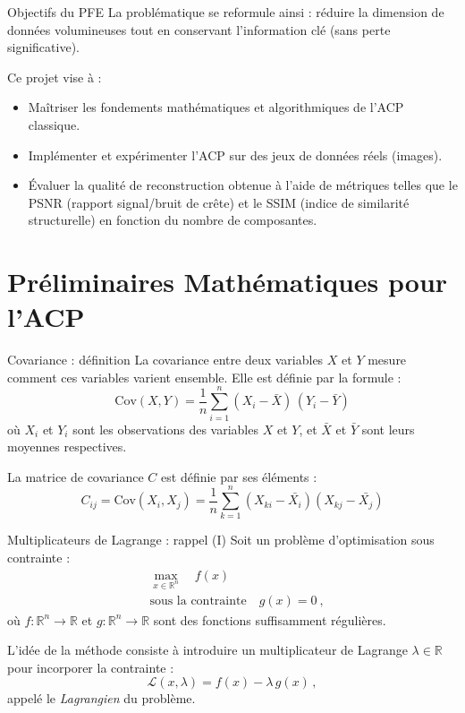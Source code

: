 \documentclass{beamer}
\begin{document}
\begin{frame}{Objectifs du PFE}
La problématique se reformule ainsi : réduire la dimension de données volumineuses tout en conservant l’information clé (sans perte significative).

Ce projet vise à :
\begin{itemize}
  \item Maîtriser les fondements mathématiques et algorithmiques de l’ACP classique.
  \item Implémenter et expérimenter l’ACP sur des jeux de données réels (images).
  \item Évaluer la qualité de reconstruction obtenue à l’aide de métriques telles que le PSNR (rapport signal/bruit de crête) et le SSIM (indice de similarité structurelle) en fonction du nombre de composantes.
\end{itemize}
\end{frame}

\section{Préliminaires Mathématiques pour l'ACP}

\begin{frame}{Covariance : définition}
La covariance entre deux variables $X$ et $Y$ mesure comment ces variables varient ensemble. Elle est définie par la formule :
\[
\text{Cov}(X, Y) = \frac{1}{n} \sum_{i=1}^n (X_i - \bar X)\,(Y_i - \bar Y)
\]
où $X_i$ et $Y_i$ sont les observations des variables $X$ et $Y$, et $\bar X$ et $\bar Y$ sont leurs moyennes respectives.

La matrice de covariance $C$ est définie par ses éléments :
\[
C_{ij} = \text{Cov}(X_i, X_j) = \frac{1}{n} \sum_{k=1}^n (X_{ki} - \bar{X_i})(X_{kj} - \bar{X_j})
\]
\end{frame}

\begin{frame}{Multiplicateurs de Lagrange : rappel (I)}
Soit un problème d'optimisation sous contrainte :
\[
\begin{aligned}
& \max_{x \in \mathbb{R}^n} \quad f(x) \\
& \text{sous la contrainte} \quad g(x) = 0~,
\end{aligned}
\]
où $f : \mathbb{R}^n \to \mathbb{R}$ et $g : \mathbb{R}^n \to \mathbb{R}$ sont des fonctions suffisamment régulières. 

L'idée de la méthode consiste à introduire un multiplicateur de Lagrange $\lambda \in \mathbb{R}$ pour incorporer la contrainte :
\[
    \mathcal{L}(x,\lambda) = f(x) - \lambda\, g(x)\,,
\]
appelé le \textit{Lagrangien} du problème.
\end{frame}
\end{document}
